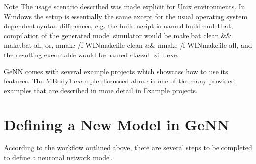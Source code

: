 \begin{DoxyNote}{Note}
The usage scenario described was made explicit for Unix environments. In Windows the setup is essentially the same except for the usual operating system dependent syntax differences, e.\+g. the build script is named buildmodel.\+bat, compilation of the generated model simulator would be {\ttfamily make.\+bat clean \&\& make.\+bat all}, or, {\ttfamily nmake /f W\+I\+Nmakefile clean \&\& nmake /f W\+I\+Nmakefile all}, and the resulting executable would be named {\ttfamily classol\+\_\+sim.\+exe}.
\end{DoxyNote}
Ge\+N\+N comes with several example projects which showcase how to use its features. The M\+Body1 example discussed above is one of the many provided examples that are described in more detail in \hyperlink{Examples}{Example projects}.\hypertarget{Quickstart_ownmodel}{}\section{Defining a New Model in Ge\+N\+N}\label{Quickstart_ownmodel}
According to the workflow outlined above, there are several steps to be completed to define a neuronal network model.


